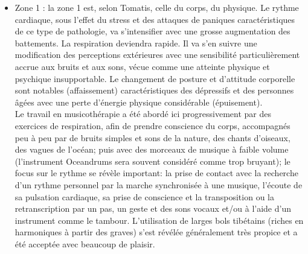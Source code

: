 
\begin{itemize}
	\item Zone 1 :  la zone 1 est, selon Tomatis, celle du corps, du physique. Le rythme cardiaque, sous 
	l'effet du stress et 
	des 
	attaques de paniques caractéristiques de ce type de pathologie, va s'intensifier avec une grosse  
	augmentation des
	battements. La respiration deviendra
	rapide. Il va s'en suivre une modification des perceptions
	extérieures avec une sensibilité particulièrement accrue aux bruits et
	aux sons, vécue comme une
	atteinte physique et psychique insupportable.
	Le changement de posture et d'attitude corporelle sont
	notables (affaissement) caractéristiques des dépressifs et  
	des personnes âgées avec une perte d'énergie physique considérable (épuisement).
		\\
	Le travail en musicothérapie a été abordé ici  progressivement par des exercices de respiration, afin de 
	prendre conscience du corps,
	accompagnés peu à peu par de bruits simples et sons de la nature, des chants d'oiseaux, des vagues 
	de l'océan; puis avec des morceaux de musique à faible 
	volume (l'instrument Oceandrums sera souvent considéré comme trop bruyant);  le focus sur le 
	rythme se révèle important: la prise de contact 
	avec la recherche d'un rythme personnel par la marche synchronisée à une musique, l'écoute de sa  
	pulsation cardiaque, sa  prise de 
	conscience et la transposition ou la retranscription par un pas, un geste et des sons vocaux et/ou à 
	l'aide d'un 
	instrument 
	comme le tambour. 
	 L'utilisation de larges bols tibétains (riches en harmoniques à partir des graves) s'est révélée 
	 généralement très propice 
	et a été acceptée avec beaucoup de plaisir.
	

\end{itemize}
